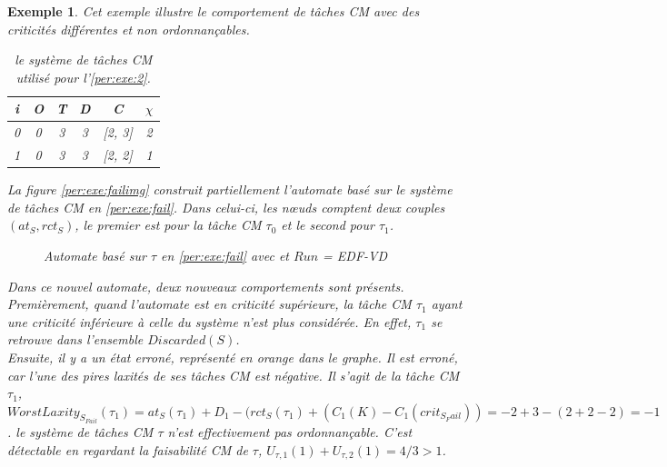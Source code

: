 \documentclass[12pt,a4paper,oneside]{book}
\theoremstyle{break}
\newtheorem{exem}{Exemple}[chapter]
\theoremstyle{breakplain}
\begin{document}
\begin{exem}
\label{per:exe:2}
Cet exemple illustre le comportement de tâches CM avec des criticités différentes et non ordonnançables.
\begin{table}[h]
    \centering
\begin{tabular}{|c|c|c|c|c|c|}
\hline
i &O & T & D & C & $\chi$\\
\hline
0 & 0 & 3 & 3 & [2, 3]& 2\\
\hline
1 & 0 & 3 & 3 & [2, 2]& 1\\
\hline
\end{tabular}
    
\caption{le système de tâches CM utilisé pour l'\autoref{per:exe:2}.}
\label{per:exe:fail}
\end{table}
La figure \autoref{per:exe:failimg} construit partiellement l'automate basé sur le système de tâches CM en \autoref{per:exe:fail}. Dans celui-ci, les nœuds comptent deux couples $(at_S, rct_S)$, le premier est pour la tâche CM $\tau_0$ et le second pour $\tau_1$.
\begin{figure}[h]
    \centering
    
    \resizebox{\textwidth}{!}{
    \fontsize{28pt}{12pt}\selectfont
    
    }
    
\caption{Automate basé sur $\tau$ en \autoref{per:exe:fail} avec et $Run$ = \textit{EDF-VD}}
\label{per:exe:failimg}
\end{figure}

Dans ce nouvel automate, deux nouveaux comportements sont présents.\\

Premièrement, quand l'automate est en criticité supérieure, la tâche CM $\tau_1$ ayant une criticité inférieure à celle du système n'est plus considérée. En effet, $\tau_1$ se retrouve dans l'ensemble $Discarded(S)$.\\

Ensuite, il y a un état erroné, représenté en orange dans le graphe. Il est erroné, car l'une des pires laxités de ses tâches CM est négative. Il s'agit de la tâche CM $\tau_1$, $WorstLaxity_{S_{Fail}}(\tau_1) = at_S(\tau_1) + D_1 - (rct_S(\tau_1) + (C_1(K)-C_1(crit_{S_Fail})) = -2 +3 - (2 +2-2) = -1$. le système de tâches CM $\tau$ n'est effectivement pas ordonnançable. C'est détectable en regardant la faisabilité CM de $\tau$, $U_{\tau, 1}(1) + U_{\tau, 2}(1)= 4/3 >1$.
\end{exem}

\pagebreak
\end{document}

